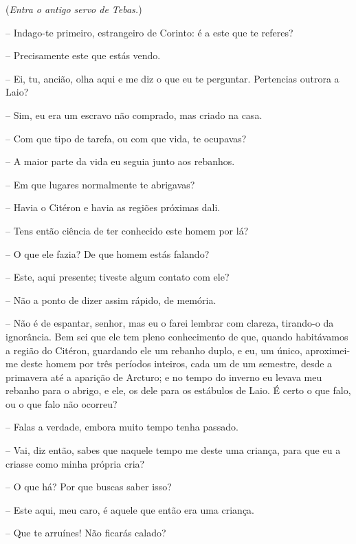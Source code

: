 (\emph{Entra o antigo servo de Tebas.})

 --    Indago-te primeiro, estrangeiro de Corinto: é a este que te
referes?

 --   Precisamente este que estás vendo.

 --   Ei, tu, ancião, olha aqui e me diz o que eu te perguntar. Pertencias
outrora a Laio?

 --   Sim, eu era um escravo não comprado, mas criado na casa.

 --   Com que tipo de tarefa, ou com que vida, te ocupavas?

 --   A maior parte da vida eu seguia junto aos rebanhos.

 --   Em que lugares normalmente te abrigavas?

 --   Havia o Citéron e havia as regiões próximas dali.

 --   Tens então ciência de ter conhecido este homem por lá?

 --   O que ele fazia? De que homem estás falando?

 --    Este, aqui presente; tiveste algum contato com ele?

 --   Não a ponto de dizer assim rápido, de memória.

 --   Não é de espantar, senhor, mas eu o farei lembrar com clareza, tirando-o
da ignorância. Bem sei que ele tem pleno conhecimento de que, quando
habitávamos a região do Citéron, guardando ele um rebanho duplo, e eu,
um único, aproximei-me deste homem por três períodos inteiros, cada um
de um semestre, desde a primavera até a aparição de Arcturo; e no tempo
do inverno eu levava meu rebanho para o abrigo, e  ele, os dele
para os estábulos de Laio. É certo o que falo, ou o que falo não
ocorreu?

 --   Falas a verdade, embora muito tempo tenha passado.

 --   Vai, diz então, sabes que naquele tempo me deste uma criança, para que
eu a criasse como minha própria cria?

 --   O que há? Por que buscas saber isso?

 --   Este aqui, meu caro, é aquele que então era uma criança.

 --   Que te arruínes! Não ficarás calado?

